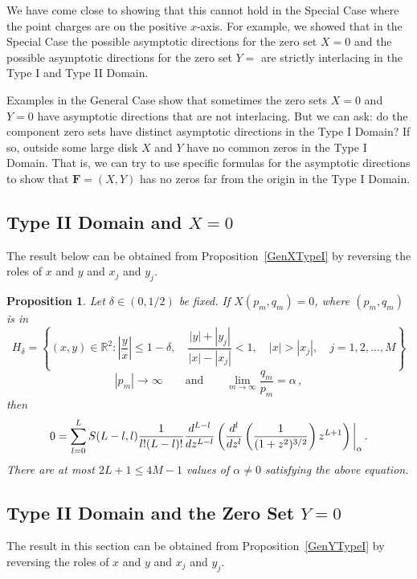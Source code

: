 \documentclass{article}
\newtheorem{prop}[thm]{Proposition}
\theoremstyle{remark}
\numberwithin{equation}{section}
\begin{document}
We have come close to showing that this cannot hold in the Special Case where the point charges are on the positive $x$-axis. For example, 
we showed that in the Special Case the possible asymptotic directions for the zero set $X=0$ and the possible asymptotic directions for the
zero set $Y=$ are strictly interlacing in the Type I and Type II Domain.     

Examples in the General Case show that sometimes the zero sets $X=0$ and $Y=0$ have asymptotic directions that are not interlacing.  
But we can ask: do the component zero sets have distinct asymptotic directions in the Type I Domain?  If so, outside some large disk $X$ and $Y$ 
have no common zeros in the Type I Domain.  That is, we can try to use specific formulas for the asymptotic directions to show that   
${\mathbf F}=(X,Y)$ has no zeros far from the origin in the Type I Domain.

\medskip

\subsection{Type II Domain and $X=0$}\label{GenXII}

The result below can be obtained from Proposition~\ref{GenXTypeI} by reversing the roles of $x$ and $y$ and $x_j$ and $y_j$.

\begin{prop}\label{GenXTypeII} Let $\delta \in (0,1/2)$ be fixed. If $X(p_m,q_m) = 0$, where $(p_m,q_m)$ is in
$$H_{\delta} = \left\{(x,y) \in {\mathbb R}^2: \left| \frac yx \right| \leq 1-\delta, \quad \frac{|y|+|y_j|}{|x|-|x_j|} < 1, \quad |x| > |x_j|, \quad j=1,2,\ldots,M \right\}$$
$$|p_m| \rightarrow \infty \qquad \text{and} \qquad \lim_{m \rightarrow \infty}{\frac{q_m}{p_m}} = \alpha\,,$$
then
\begin{equation} \notag
0 = \sum_{l=0}^L S(L-l,l) \frac {1}{l!(L-l)!} 
\frac{d^{L-l}}{dz^{L-l}} \left( \frac{d^l}{dz^l} \left( \frac{1}{(1 +z^2)^{3/2}} \right)z^{L+1} \right)\bigg |_\alpha\,.
\end{equation}
There are at most $2L+1 \leq 4M-1$ values of $\alpha \neq 0$ satisfying the above equation.
\end{prop}

\subsection{Type II Domain and the Zero Set $Y=0$}

The result in this section can be obtained from Proposition~\ref{GenYTypeI} by reversing the roles of $x$ and $y$ and $x_j$ and $y_j$.
\end{document}
